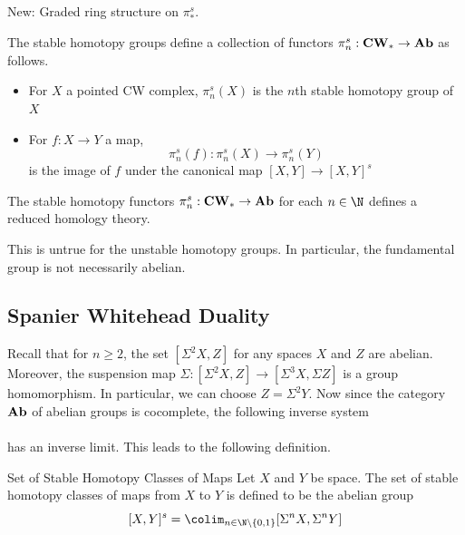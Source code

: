 \documentclass[a4paper]{article}
\begin{document}
New: Graded ring structure on $\pi_\ast^s$. \\

\begin{thm}{}{} The stable homotopy groups define a collection of functors $\pi_n^s:\bold{CW}_\ast\to\bold{Ab}$ as follows. 
\begin{itemize}
\item For $X$ a pointed CW complex, $\pi_n^s(X)$ is the $n$th stable homotopy group of $X$
\item For $f:X\to Y$ a map, $$\pi_n^s(f):\pi_n^s(X)\to\pi_n^s(Y)$$ is the image of $f$ under the canonical map $[X,Y]\to[X,Y]^s$
\end{itemize}
\end{thm}

\begin{thm}{}{} The stable homotopy functors $\pi_n^s:\bold{CW}_\ast\to\bold{Ab}$ for each $n\in\N$ defines a reduced homology theory. 
\end{thm}

This is untrue for the unstable homotopy groups. In particular, the fundamental group is not necessarily abelian. 

\subsection{Spanier Whitehead Duality}
Recall that for $n\geq 2$, the set $[\Sigma^2X,Z]$ for any spaces $X$ and $Z$ are abelian. Moreover, the suspension map $\Sigma:[\Sigma^2X,Z]\to[\Sigma^3X,\Sigma Z]$ is a group homomorphism. In particular, we can choose $Z=\Sigma^2Y$. Now since the category $\bold{Ab}$ of abelian groups is cocomplete, the following inverse system \\
\\
has an inverse limit. This leads to the following definition. 

\begin{defn}{Set of Stable Homotopy Classes of Maps}{} Let $X$ and $Y$ be space. The set of stable homotopy classes of maps from $X$ to $Y$ is defined to be the abelian group $$[X,Y]^s=\colim_{n\in\N\setminus\{0,1\}}[\Sigma^nX,\Sigma^nY]$$
\end{defn}
\end{document}
